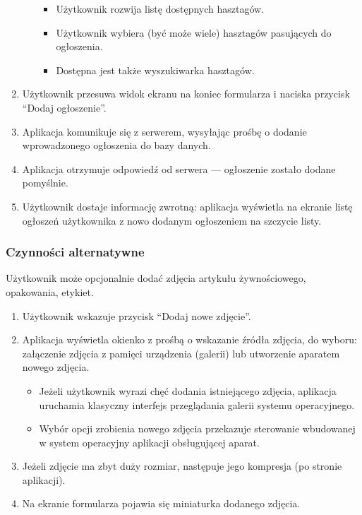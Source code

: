 \documentclass[licencjacka]{pracamgr}
\begin{document}
\begin{enumerate}
\begin{itemize}
\begin{itemize}
                \item Użytkownik rozwija listę dostępnych hasztagów.
                \item Użytkownik wybiera (być może wiele) hasztagów pasujących do ogłoszenia.
                \item Dostępna jest także wyszukiwarka hasztagów.
            \end{itemize}
        \end{itemize}
        \item Użytkownik przesuwa widok ekranu na koniec formularza i naciska przycisk ``Dodaj ogłoszenie''.
        \item Aplikacja komunikuje się z serwerem, wysyłając prośbę o dodanie wprowadzonego ogłoszenia do bazy danych.
        \item Aplikacja otrzymuje odpowiedź od serwera --- ogłoszenie zostało dodane pomyślnie.
        \item Użytkownik dostaje informację zwrotną: aplikacja wyświetla na ekranie listę ogłoszeń użytkownika z nowo dodanym ogłoszeniem na szczycie listy.
    \end{enumerate}
    \subsubsection{Czynności alternatywne}
    Użytkownik może opcjonalnie dodać zdjęcia artykułu żywnościowego, opakowania, etykiet.
    \begin{enumerate}
        \item Użytkownik wskazuje przycisk ``Dodaj nowe zdjęcie''.
        \item Aplikacja wyświetla okienko z prośbą o wskazanie źródła zdjęcia, do wyboru: załączenie zdjęcia z pamięci urządzenia (galerii)
        lub utworzenie aparatem nowego zdjęcia.
        \begin{itemize}
            \item Jeżeli użytkownik wyrazi chęć dodania istniejącego zdjęcia, aplikacja uruchamia klasyczny interfejs przeglądania galerii
            systemu operacyjnego.
            \item Wybór opcji zrobienia nowego zdjęcia przekazuje sterowanie wbudowanej w system operacyjny aplikacji obsługującej aparat.
        \end{itemize}
        \item Jeżeli zdjęcie ma zbyt duży rozmiar, następuje jego kompresja (po stronie aplikacji).
        \item Na ekranie formularza pojawia się miniaturka dodanego zdjęcia.
    \end{enumerate}
\end{document}

